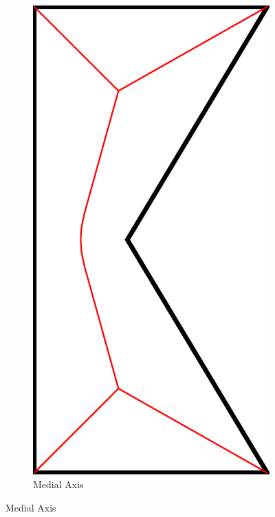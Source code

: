 \begin{figure}\centering
\setlength{\figwidth}{0.24\columnwidth}
\setlength{\figwidthTwo}{0.3\columnwidth}
\begin{subfigure}[t]{\figwidth}\centering
\includegraphics[height=\figwidthTwo]{sources-method-simple-skeleton-mat}
\caption{Medial Axis}\label{shape_decomposition_mat}

\end{subfigure}
\end{figure}
